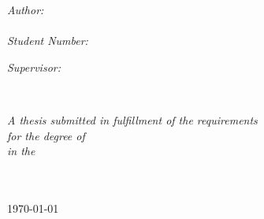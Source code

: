 \documentclass[
11pt, %
english, %
singlespacing, %
headsepline, %
]{MastersDoctoralThesis} %
\begin{document}
\begin{titlepage}
\begin{center}
\begin{minipage}[t]{0.4\textwidth}
\begin{flushleft} \large
\emph{Author:}\\
\href{https://prg.is.titech.ac.jp/people/jacob-lindahl/}{\authorname}\\[0.3cm] %
\emph{Student Number:}\\
\textsc{\studentnumname}
\end{flushleft}
\end{minipage}
\begin{minipage}[t]{0.4\textwidth}
\begin{flushright} \large
\emph{Supervisor:} \\
\href{http://prg.is.titech.ac.jp/people/masuhara/}{\supname} %
\end{flushright}
\end{minipage}\\[3cm]

\vfill

\large \textit{A thesis submitted in fulfillment of the requirements\\ for the degree of \degreename}\\[0.3cm] %
\textit{in the}\\[0.4cm]
\groupname\\\deptname\\[2cm] %

\vfill

{\large \today}\\[4cm] %

\vfill
\end{center}
\end{titlepage}


\end{document}
